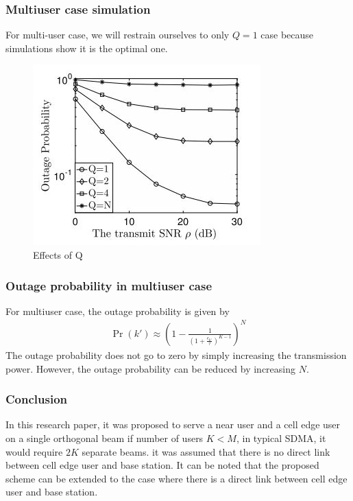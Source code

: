 \documentclass{beamer}
\providecommand{\pr}[1]{\ensuremath{\Pr\left(#1\right)}}
\providecommand{\brak}[1]{\ensuremath{\left(#1\right)}}
\begin{document}
\begin{frame}
\frametitle{Multiuser case simulation}
For multi-user case, we will restrain ourselves to only $Q=1$ case because simulations show it is the optimal one.
\begin{figure}[H]
\centering
\includegraphics[width=.65\linewidth]{figure/multi_q}
\caption{Effects of Q}
\label{fig:4}
\end{figure}

\end{frame}
\begin{frame}
\frametitle{Outage probability in multiuser case}
For multiuser case, the outage probability is given by
\begin{align}
\pr{k'}\approx\brak{1-\frac{1}{\brak{1+\frac{\epsilon_{k'}}{\tau}}^{K-1}}}^N
\end{align}
The outage probability does not go to zero by simply increasing the transmission power. However, the outage probability can be reduced by increasing $N$.
\end{frame}

\begin{frame}
\frametitle{Conclusion}
In this research paper, it was proposed to serve a near user and a cell edge user on a single orthogonal beam if number of users $K<M$, in typical SDMA, it would require $2K$ separate beams. it was assumed that there is no direct link between cell edge user and base station. It can be noted that the proposed scheme can be extended to the case where there is a direct link between cell edge user and base station.
\end{frame}
\end{document}
